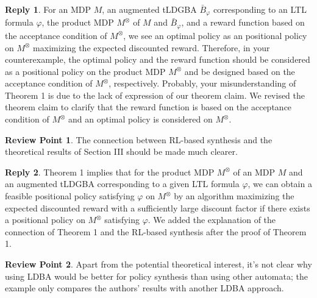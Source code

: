\documentclass[10 pt, dvipdfmx]{article}
\theoremstyle{definition}
\newtheorem{review point}{Review Point}[section]
\newtheorem*{reply}{Reply}
\begin{document}
\begin{reply}
  For an MDP $M$, an augmented tLDGBA $\bar{B}_{\varphi}$ corresponding to an LTL formula $\varphi$, the product MDP $M^{\otimes}$ of $M$ and $\bar{B}_{\varphi}$, and a reward function based on the acceptance condition of $M^{\otimes}$, we see an optimal policy as an positional policy on $M^{\otimes}$ maximizing the expected discounted reward. Therefore, in your counterexample, the optimal policy and the reward function should be considered as a positional policy on the product MDP $M^{\otimes}$ and be designed based on the acceptance condition of $M^{\otimes}$, respectively. Probably, your misunderstanding of Theorem 1 is due to the lack of expression of our theorem claim. We revised the theorem claim to clarify that the reward function is based on the acceptance condition of $M^{\otimes}$ and an optimal policy is considered on $M^{\otimes}$.
\end{reply}

\begin{review point}
  The connection between RL-based synthesis and the theoretical results
of Section III should be made much clearer.
\end{review point}

\begin{reply}
  Theorem 1 implies that for the product MDP $M^{\otimes}$ of an MDP $M$ and an augmented tLDGBA corresponding to a given LTL formula $\varphi$, we can obtain a feasible positional policy satisfying $\varphi$ on $M^{\otimes}$ by an algorithm maximizing the expected discounted reward with a sufficiently large discount factor if there exists a positional policy on $M^{\otimes}$ satisfying $\varphi$. We added the explanation of the connection of Theorem 1 and the RL-based synthesis after the proof of Theorem 1.
\end{reply}

\begin{review point}
  Apart from the potential theoretical interest, it's not clear why
using LDBA would be better for policy synthesis than using other
automata; the example only compares the authors' results with another
LDBA approach.
\end{review point}
\end{document}

